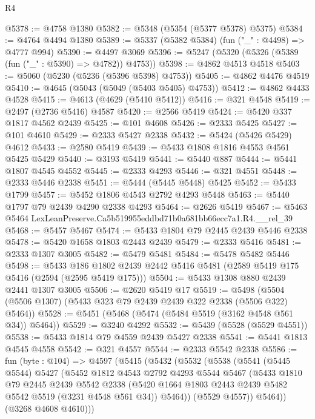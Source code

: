 \begin{lexlean}{R4}
\begin{coremodule}
@5378 := @4758 @1380
@5382 := @5348 (@5354 (@5377 @5378) @5375)
@5384 := @4764 @4494 @1380
@5389 := @5337 (@5382 @5384) (fun ("_" : @4498) => @4777 @994)
@5390 := @4497 @3069
@5396 := @5247 (@5320 (@5326 (@5389 (fun ("_" : @5390) => @4782)) @4753))
@5398 := @4862 @4513 @4518
@5403 := @5060 (@5230 (@5236 (@5396 @5398) @4753))
@5405 := @4862 @4476 @4519
@5410 := @4645 (@5043 (@5049 (@5403 @5405) @4753))
@5412 := @4862 @4433 @4528
@5415 := @4613 (@4629 (@5410 @5412))
@5416 := @321 @4548
@5419 := @2497 (@2736 @5416) @4587
@5420 := @2566 @5419
@5424 := @5420 @337 @1817 @4562 @2439
@5425 := @101 @4608
@5426 := @2333 @5425
@5427 := @101 @4610
@5429 := @2333 @5427 @2338
@5432 := @5424 (@5426 @5429) @4612
@5433 := @2580 @5419
@5439 := @5433 @1808 @1816 @4553 @4561 @5425 @5429
@5440 := @3193 @5419
@5441 := @5440 @887
@5444 := @5441 @1807 @4545 @4552
@5445 := @2333 @4293
@5446 := @321 @4551
@5448 := @2333 @5446 @2338
@5451 := @5444 (@5445 @5448) @5425
@5452 := @5433 @1799
@5457 := @5452 @1806 @4543 @2792 @4293 @5448
@5463 := @5440 @1797 @79 @2439 @4290 @2338 @4293
@5464 := @2626 @5419
@5467 := @5463 @5464 LexLeanPreserve.Ca5b519955eddbd71b0a681bb66ecc7a1.R4.__rel_39
@5468 := @5457 @5467
@5474 := @5433 @1804 @79 @2445 @2439 @5446 @2338
@5478 := @5420 @1658 @1803 @2443 @2439
@5479 := @2333 @5416
@5481 := @2333 @1307 @3005
@5482 := @5479 @5481
@5484 := @5478 @5482 @5446
@5498 := @5433
    @186
    @1802
    @2439
    @2442
    @5416
    @5481
    (@2589 @5419 @175 @5416 (@2594 (@2595 @5419 @175)))
@5504 := @5433 @1308 @880 @2439 @2441 @1307 @3005
@5506 := @2620 @5419 @17
@5519 := @5498 (@5504 (@5506 @1307) (@5433 @323 @79 @2439 @2439 @322 @2338 (@5506 @322) @5464))
@5528 := @5451 (@5468 (@5474 (@5484 @5519 (@3162 @4548 @561 @34)) @5464))
@5529 := @3240 @4292
@5532 := @5439 (@5528 (@5529 @4551))
@5538 := @5433 @1814 @79 @4559 @2439 @5427 @2338
@5541 := @5441 @1813 @4545 @4558
@5542 := @321 @4557
@5544 := @2333 @5542 @2338
@5586 := fun (byte : @104) =>
  @4597
    (@5415
      (@5432
        (@5532
          (@5538
            (@5541
              (@5445 @5544)
              @5427
              (@5452
                @1812
                @4543
                @2792
                @4293
                @5544
                @5467
                (@5433
                  @1810
                  @79
                  @2445
                  @2439
                  @5542
                  @2338
                  (@5420 @1664 @1803 @2443 @2439 @5482 @5542 @5519 (@3231 @4548 @561 @34))
                  @5464))
              (@5529 @4557))
            @5464))
        (@3268 @4608 @4610)))

\end{coremodule}
\end{lexlean}
